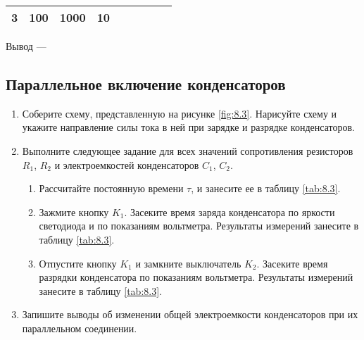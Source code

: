 \begin{table}[h]
\begin{tabular}{|c|cc|c|c|cc|cc|}
3                  & \multicolumn{1}{c|}{100}        & 1000       & 10                                      &                                          & \multicolumn{1}{c|}{}                                                                 &                                                                    & \multicolumn{1}{c|}{}                                                                &                                                                     \\ \hline
\end{tabular}
\end{table}


Вывод --- \hrulefill

\hrulefill

\hrulefill

\subsection{Параллельное включение конденсаторов}

\begin{enumerate}

	\item Соберите схему, представленную на рисунке \ref{fig:8.3}. Нарисуйте схему и укажите направление силы тока в ней при зарядке и разрядке конденсаторов.
	\item Выполните следующее задание для всех значений сопротивления резисторов $R_1$, $R_2$ и электроемкостей конденсаторов $C_1$, $C_2$.	
	\begin{enumerate}	
	\item Рассчитайте постоянную времени $\tau$, и занесите ее в таблицу \ref{tab:8.3}.
	\item Зажмите кнопку $K_1$. Засеките время заряда конденсатора по яркости светодиода и по показаниям вольтметра. Результаты измерений занесите в таблицу \ref{tab:8.3}.
	\item Отпустите кнопку $K_1$ и замкните выключатель $K_2$. Засеките время разрядки конденсатора по показаниям вольтметра. Результаты измерений занесите в таблицу \ref{tab:8.3}.
	\end{enumerate}
	\item Запишите выводы об изменении общей электроемкости конденсаторов при их параллельном соединении.


\end{enumerate}


\newpage 

